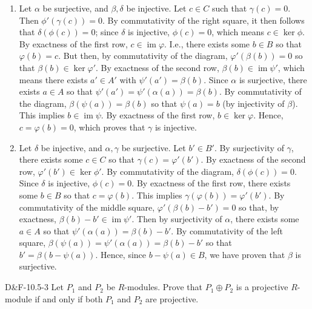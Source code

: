 \documentclass{article}
\begin{document}
	\begin{enumerate}[itemsep=-2pt,label = (\alph{*})]
		\item Let $\alpha$ be surjective, and $\beta, \delta$ be injective. Let $c \in C$ such that $\gamma(c) = 0$. Then $\phi'(\gamma(c)) = 0$. By commutativity of the right square, it then follows that $\delta(\phi(c)) = 0$; since $\delta$ is injective, $\phi(c) = 0$, which means $c \in \ker{\phi}$. By exactness of the first row, $c \in \operatorname{im}{\varphi}$. I.e., there exists some $b \in B$ so that $\varphi(b) = c$. But then, by commutativity of the diagram, $\varphi'(\beta(b)) = 0$ so that $\beta(b) \in \ker{\varphi'}$. By exactness of the second row, $\beta(b) \in \operatorname{im}{\psi'}$, which means there exists $a' \in A'$ with $\psi'(a') = \beta(b)$. Since $\alpha$ is surjective, there exists $a \in A$ so that $\psi'(a') = \psi'(\alpha(a)) = \beta(b)$. By commutativity of the diagram, $\beta(\psi(a)) = \beta(b)$ so that $\psi(a) = b$ (by injectivity of $\beta$). This implies $b \in \operatorname{im}{\psi}$. By exactness of the first row, $b \in \ker{\varphi}$. Hence, $c = \varphi(b) = 0$, which proves that $\gamma$ is injective. 
		\item Let $\delta$ be injective, and $\alpha, \gamma$ be surjective. Let $b' \in B'$. By surjectivity of $\gamma$, there exists some $c \in C$ so that $\gamma(c) = \varphi'(b')$. By exactness of the second row, $\varphi'(b') \in \ker{\phi'}$. By commutativity of the diagram, $\delta(\phi(c)) = 0$. Since $\delta$ is injective, $\phi(c) = 0$. By exactness of the first row, there exists some $b \in B$ so that $c = \varphi(b)$. This implies $\gamma(\varphi(b)) = \varphi'(b')$. By commutativity of the middle square, $\varphi'(\beta(b) - b') = 0$ so that, by exactness, $\beta(b) - b' \in \operatorname{im}{\psi'}$. Then by surjectivity of $\alpha$, there exists some $a \in A$ so that $\psi'(\alpha(a)) = \beta(b) - b'$. By commutativity of the left square, $\beta(\psi(a)) = \psi'(\alpha(a)) = \beta(b) - b'$ so that $b' = \beta(b - \psi(a))$. Hence, since $b - \psi(a) \in B$, we have proven that $\beta$ is surjective. 
	\end{enumerate}
	
	\begin{prb}{D\&F-10.5-3}
		Let $P_{1}$ and $P_{2}$ be $R$-modules. Prove that $P_{1} \oplus P_{2}$ is a projective $R$-module if and only if both $P_{1}$ and $P_{2}$ are projective. 
	\end{prb}
	
\end{document}
